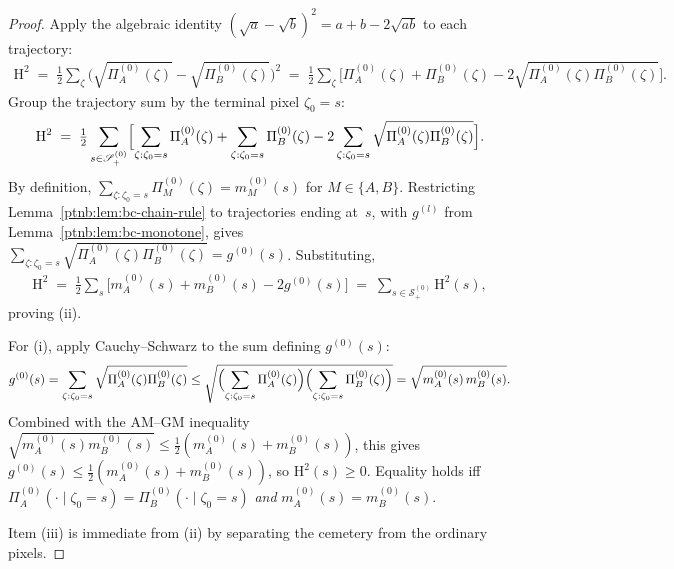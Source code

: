 \begin{proof}
Apply the algebraic identity $(\sqrt{a} - \sqrt{b})^2 = a + b - 2\sqrt{ab}$ to each trajectory:
\begin{align}
    \mathrm{H}^2 \;=\; \tfrac{1}{2}\sum_{\zeta}\bigl(\sqrt{\Pi^{(0)}_A(\zeta)} -
    \sqrt{\Pi^{(0)}_B(\zeta)}\bigr)^2
    \;=\; \tfrac{1}{2}\sum_{\zeta}\bigl[\Pi^{(0)}_A(\zeta) + \Pi^{(0)}_B(\zeta) -
    2\sqrt{\Pi^{(0)}_A(\zeta)\Pi^{(0)}_B(\zeta)}\bigr].
\end{align}
Group the trajectory sum by the terminal pixel $\zeta_0 = s$:
\begin{align}
    \mathrm{H}^2 \;=\; \tfrac{1}{2}\sum_{s \in \mathcal{S}^{(0)}_+}\Bigl[\sum_{\zeta: \zeta_0 =
    s}\Pi^{(0)}_A(\zeta)
    + \sum_{\zeta: \zeta_0 = s}\Pi^{(0)}_B(\zeta)
    - 2\sum_{\zeta: \zeta_0 = s}\sqrt{\Pi^{(0)}_A(\zeta)\Pi^{(0)}_B(\zeta)}\Bigr].
\end{align}
By definition, $\sum_{\zeta: \zeta_0 = s}\Pi^{(0)}_M(\zeta) = m^{(0)}_M(s)$ for $M \in \{A,B\}$.
Restricting Lemma~\ref{ptnb:lem:bc-chain-rule} to trajectories ending at~$s$, with
$g^{(l)}$ from Lemma~\ref{ptnb:lem:bc-monotone}, gives $\sum_{\zeta: \zeta_0 =
    s}\sqrt{\Pi^{(0)}_A(\zeta)\Pi^{(0)}_B(\zeta)} = g^{(0)}(s)$.  Substituting,
\begin{align}
    \mathrm{H}^2 \;=\; \tfrac{1}{2}\sum_s\bigl[m^{(0)}_A(s) + m^{(0)}_B(s) - 2g^{(0)}(s)\bigr]
    \;=\; \sum_{s \in \mathcal{S}^{(0)}_+} \mathrm{H}^2(s),
\end{align}
proving (ii).

For (i), apply Cauchy--Schwarz to the sum defining $g^{(0)}(s)$:
\begin{align}
    g^{(0)}(s)
    = \sum_{\zeta: \zeta_0 = s} \sqrt{\Pi^{(0)}_A(\zeta) \Pi^{(0)}_B(\zeta)}
    \leq \sqrt{\Bigl(\sum_{\zeta: \zeta_0 = s}\Pi^{(0)}_A(\zeta)\Bigr)\Bigl(\sum_{\zeta: \zeta_0 =
    s}\Pi^{(0)}_B(\zeta)\Bigr)}
    = \sqrt{m^{(0)}_A(s)\,m^{(0)}_B(s)}.
\end{align}
Combined with the AM--GM inequality $\sqrt{m^{(0)}_A(s)m^{(0)}_B(s)} \leq \tfrac{1}{2}(m^{(0)}_A(s)
    + m^{(0)}_B(s))$, this gives $g^{(0)}(s) \leq \tfrac{1}{2}(m^{(0)}_A(s) + m^{(0)}_B(s))$, so
$\mathrm{H}^2(s) \geq 0$.  Equality holds iff $\Pi^{(0)}_A(\cdot \mid \zeta_0 = s) =
    \Pi^{(0)}_B(\cdot \mid \zeta_0 = s)$ \emph{and} $m^{(0)}_A(s) = m^{(0)}_B(s)$.

Item (iii) is immediate from (ii) by separating the cemetery from the ordinary pixels.
\end{proof}

